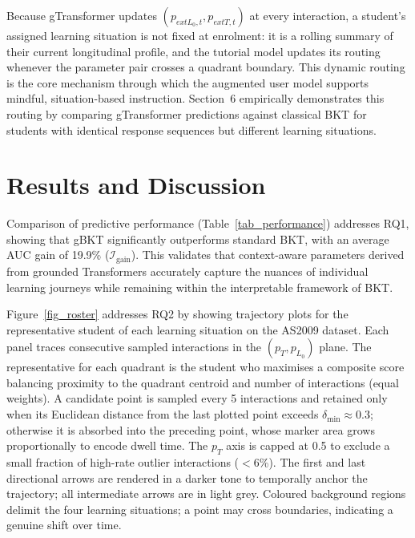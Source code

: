\documentclass[runningheads]{llncs}
\begin{document}
Because gTransformer updates $(p_{	ext{L}_0,t}, p_{	ext{T},t})$ at every interaction, a student's assigned learning situation is not fixed at enrolment: it is a rolling summary of their current longitudinal profile, and the tutorial model updates its routing whenever the parameter pair crosses a quadrant boundary. This dynamic routing is the core mechanism through which the augmented user model supports mindful, situation-based instruction. Section~6 empirically demonstrates this routing by comparing gTransformer predictions against classical BKT for students with identical response sequences but different learning situations.

%
\section{Results and Discussion}

Comparison of predictive performance (Table~\ref{tab_performance}) addresses RQ1, showing that gBKT significantly outperforms standard BKT, with an average AUC gain of 19.9\% ($\mathcal{I}_{\text{gain}}$). This validates that context-aware parameters derived from grounded Transformers accurately capture the nuances of individual learning journeys while remaining within the interpretable framework of BKT.

Figure~\ref{fig_roster} addresses RQ2 by showing trajectory plots for the representative student of each learning situation on the AS2009 dataset. Each panel traces consecutive sampled interactions in the $(p_T, p_{L_0})$ plane. The representative for each quadrant is the student who maximises a composite score balancing proximity to the quadrant centroid and number of interactions (equal weights). A candidate point is sampled every 5 interactions and retained only when its Euclidean distance from the last plotted point exceeds $\delta_{\min}\approx 0.3$; otherwise it is absorbed into the preceding point, whose marker area grows proportionally to encode dwell time. The $p_T$ axis is capped at 0.5 to exclude a small fraction of high-rate outlier interactions ($<$6\%). The first and last directional arrows are rendered in a darker tone to temporally anchor the trajectory; all intermediate arrows are in light grey. Coloured background regions delimit the four learning situations; a point may cross boundaries, indicating a genuine shift over time.
\end{document}
